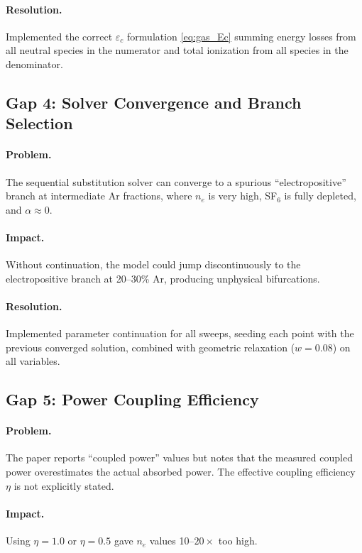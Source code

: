 \documentclass[11pt,a4paper]{report}
\begin{document}
\paragraph{Resolution.} Implemented the correct $\varepsilon_c$ formulation \eqref{eq:gas_Ec} summing energy losses from all neutral species in the numerator and total ionization from all species in the denominator.

\subsection{Gap 4: Solver Convergence and Branch Selection}
\label{sec:gap4}

\paragraph{Problem.} The sequential substitution solver can converge to a spurious ``electropositive'' branch at intermediate Ar fractions, where $n_e$ is very high, SF$_6$ is fully depleted, and $\alpha \approx 0$.

\paragraph{Impact.} Without continuation, the model could jump discontinuously to the electropositive branch at 20--30\% Ar, producing unphysical bifurcations.

\paragraph{Resolution.} Implemented parameter continuation for all sweeps, seeding each point with the previous converged solution, combined with geometric relaxation ($w = 0.08$) on all variables.

\subsection{Gap 5: Power Coupling Efficiency}
\label{sec:gap5}

\paragraph{Problem.} The paper reports ``coupled power'' values but notes that the measured coupled power overestimates the actual absorbed power.  The effective coupling efficiency $\eta$ is not explicitly stated.

\paragraph{Impact.} Using $\eta = 1.0$ or $\eta = 0.5$ gave $n_e$ values 10--$20\times$ too high.
\end{document}
